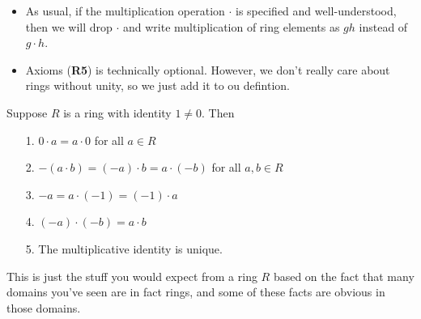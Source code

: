 \begin{remark}
    \begin{itemize}
        \item As usual, if the multiplication operation $\cdot$ is specified and
        well-understood, then we will drop $\cdot$ and write
        multiplication of ring elements as $gh$ instead of $g \cdot h$.

        \item Axioms (\textbf{R5}) is technically optional. However, we don't really 
        care about rings without unity, so we just add it to ou defintion.
    \end{itemize}
\end{remark}


\begin{proposition}
    Suppose $R$ is a ring with identity $1 \ne 0$. Then 
    \begin{itemize}
        \item[1.] $0 \cdot a = a \cdot 0$ for all $a \in R$ 
        \item[2.] $-(a \cdot b) = (-a) \cdot b = a \cdot (-b)$ for
        all $a, b \in R$ 
        \item[3.] $-a = a \cdot (-1) = (-1) \cdot a$
        \item[4.] $(-a) \cdot (-b) =  a \cdot b$ 
        \item[5.] The multiplicative identity is unique.   
    \end{itemize}
\end{proposition}
This is just the stuff you would expect from a ring $R$ based
on the fact that many domains you've seen are in fact rings,
and some of these facts are obvious in those domains.


